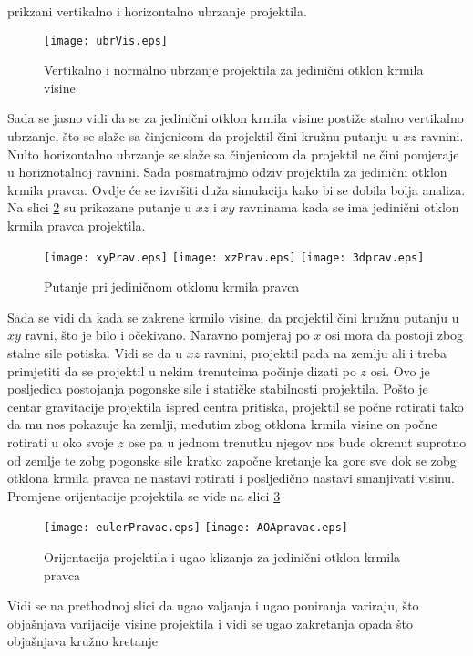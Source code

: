 prikzani vertikalno i horizontalno ubrzanje projektila.
\begin{figure}[!ht]
    \centering 
    \texttt{[image: ubrVis.eps]}
    \caption{Vertikalno i normalno ubrzanje projektila za jedinični otklon krmila visine}
    \label{fig:ubrVis}
\end{figure}
Sada se jasno vidi da se za jedinični otklon krmila visine postiže stalno vertikalno ubrzanje, što se slaže sa 
činjenicom da projektil čini kružnu putanju u $xz$ ravnini. Nulto horizontalno ubrzanje 
se slaže sa činjenicom da projektil ne čini pomjeraje u horiznotalnoj ravnini. 
Sada posmatrajmo odziv projektila za jedinični otklon krmila pravca. Ovdje će se izvršiti 
duža simulacija kako bi se dobila bolja analiza. Na slici \ref{fig:putanjePrav} su prikazane 
putanje u $xz$ i $xy$ ravninama kada se ima jedinični otklon krmila pravca projektila. 
\begin{figure}[!ht]
    \centering
    \texttt{[image: xyPrav.eps]}
    \texttt{[image: xzPrav.eps]}
    \texttt{[image: 3dprav.eps]}
    \caption{Putanje pri jediničnom otklonu krmila pravca}
    \label{fig:putanjePrav}
\end{figure}
Sada se vidi da kada se zakrene krmilo visine, da projektil čini kružnu putanju u $xy$ ravni, što je bilo 
i očekivano. Naravno pomjeraj po $x$ osi mora da postoji zbog stalne sile potiska. Vidi se da u 
$xz$ ravnini, projektil pada na zemlju ali i treba primjetiti da se projektil u nekim 
trenutcima počinje dizati po $z$ osi. Ovo je posljedica postojanja pogonske sile i statičke stabilnosti projektila. 
Pošto je centar gravitacije projektila ispred centra pritiska, projektil se počne rotirati tako da mu nos 
pokazuje ka zemlji, međutim zbog otklona krmila visine on počne rotirati u oko svoje $z$ ose pa u jednom trenutku 
njegov nos bude okrenut suprotno od zemlje te zobg pogonske sile kratko započne kretanje ka gore sve dok se 
zobg otklona krmila pravca ne nastavi rotirati i posljedično nastavi smanjivati visinu. 
Promjene orijentacije projektila se vide na slici \ref{fig:eulerPravac}
\begin{figure}[!ht]
    \centering
    \texttt{[image: eulerPravac.eps]}
    \texttt{[image: AOApravac.eps]}
    \caption{Orijentacija projektila i ugao klizanja za jedinični otklon krmila pravca}
    \label{fig:eulerPravac}
\end{figure}
Vidi se na prethodnoj slici da ugao valjanja i ugao poniranja variraju, što objašnjava 
varijacije visine projektila i vidi se ugao zakretanja opada što objašnjava kružno kretanje 
